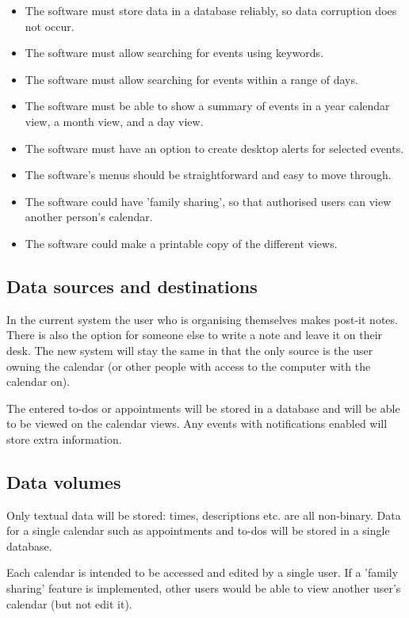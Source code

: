 \begin{itemize}
  \item The software must store data in a database reliably, so data
        corruption does not occur.
  \item The software must allow searching for events using keywords.
  \item The software must allow searching for events within a range of
        days.
  \item The software must be able to show a summary of events in a year
        calendar view, a month view, and a day view.
  \item The software must have an option to create desktop alerts for selected
        events.
  \item The software's menus should be straightforward and easy to move
        through.
  \item The software could have 'family sharing', so that authorised
        users can view another person's calendar.
  \item The software could make a printable copy of the different views.
\end{itemize}


\subsection{Data sources and destinations}

In the current system the user who is organising themselves makes post-it notes.
There is also the option for someone else to write a note and leave it on their
desk. The new system will stay the same in that the only source is the user
owning the calendar (or other people with access to the computer with the
calendar on).

The entered to-dos or appointments will be stored in a database and will be able
to be viewed on the calendar views. Any events with notifications enabled will
store extra information.


\subsection{Data volumes}

Only textual data will be stored: times, descriptions etc. are all
non-binary. Data for a single calendar such as appointments and to-dos will be
stored in a single database.

Each calendar is intended to be accessed and edited by a single user. If a
'family sharing' feature is implemented, other users would be able to view
another user's calendar (but not edit it).

